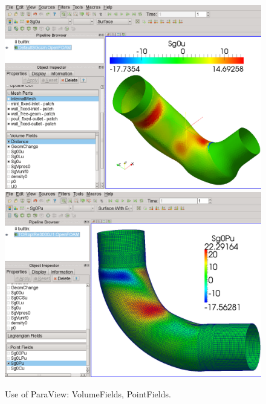 \documentclass[oneside]{article}
\numberwithin{equation}{section}
\numberwithin{figure}{section}
\numberwithin{figure}{section}
\begin{document}
\begin{figure}[h]
    \centering
    \includegraphics[scale=0.23]{paraview1.png}
    \includegraphics[scale=0.23]{paraview3.png}
    \caption{Use of ParaView: VolumeFields, PointFields.} 
    \label{fig:paraview}
\end{figure}
\end{document}
